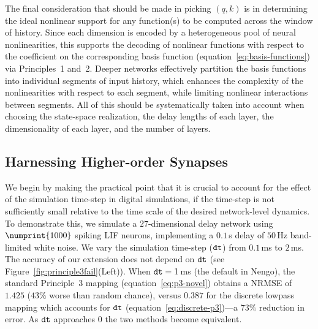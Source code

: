 The final consideration that should be made in picking $(q, k)$ is in determining the ideal nonlinear support for any function(s) to be computed across the window of history.
Since each dimension is encoded by a heterogeneous pool of neural nonlinearities, this supports the decoding of nonlinear functions with respect to the coefficient on the corresponding basis function (equation~\ref{eq:basis-functions}) via Principles~1 and~2.
Deeper networks effectively partition the basis functions into individual segments of input history, which enhances the complexity of the nonlinearities with respect to each segment, while limiting nonlinear interactions between segments.
All of this should be systematically taken into account when choosing the state-space realization, the delay lengths of each layer, the dimensionality of each layer, and the number of layers.

\subsection{Harnessing Higher-order Synapses}
\label{sec:pure_delay}


We begin by making the practical point that it is crucial to account for the effect of the simulation time-step in digital simulations, if the time-step is not sufficiently small relative to the time scale of the desired network-level dynamics.
To demonstrate this, we simulate a $27$-dimensional delay network using $\numprint{1000}$ spiking LIF neurons, implementing a $0.1$\,s delay of $50$\,Hz band-limited white noise.
We vary the simulation time-step ($\texttt{dt}{}$) from $0.1$\,ms to $2$\,ms.
The accuracy of our extension does not depend on $\texttt{dt}{}$ (see Figure~\ref{fig:principle3fail}(Left)).
When $\texttt{dt}{}=1$\,ms (the default in Nengo), the standard Principle~3 mapping (equation~\ref{eq:p3-novel}) obtains a NRMSE of $1.425$ ($43\%$ worse than random chance), versus $0.387$ for the discrete lowpass mapping which accounts for $\texttt{dt}{}$ (equation~\ref{eq:discrete-p3})---a $73\%$ reduction in error.
As $\texttt{dt}{}$ approaches $0$ the two methods become equivalent.

